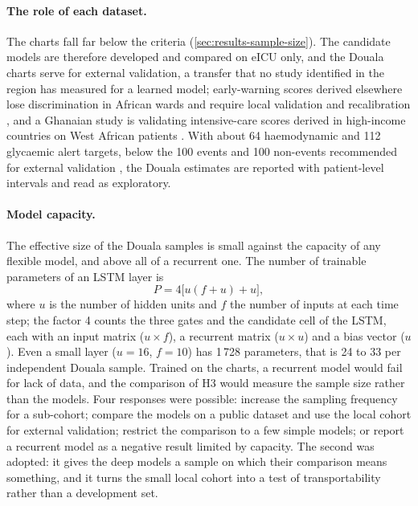 \paragraph{The role of each dataset.} The charts fall far below the criteria (\cref{sec:results-sample-size}). The candidate models are therefore developed and compared on eICU only, and the Douala charts serve for external validation, a transfer that no study identified in the region has measured for a learned model; early-warning scores derived elsewhere lose discrimination in African wards and require local validation and recalibration \parencite{moore2017uva,tomas2026ews}, and a Ghanaian study is validating intensive-care scores derived in high-income countries on West African patients \parencite{hayfronbenjamin2026}. With about 64 haemodynamic and 112 glycaemic alert targets, below the 100 events and 100 non-events recommended for external validation \parencite{collins2016,riley2021external}, the Douala estimates are reported with patient-level intervals and read as exploratory.

\paragraph{Model capacity.} The effective size of the Douala samples is small against the capacity of any flexible model, and above all of a recurrent one. The number of trainable parameters of an LSTM layer is
\begin{equation}
  P = 4\bigl[u(f+u) + u\bigr] ,
\end{equation}
where $u$ is the number of hidden units and $f$ the number of inputs at each time step; the factor 4 counts the three gates and the candidate cell of the LSTM, each with an input matrix ($u \times f$), a recurrent matrix ($u \times u$) and a bias vector ($u$). Even a small layer ($u = 16$, $f = 10$) has 1\,728 parameters, that is 24 to 33 per independent Douala sample. Trained on the charts, a recurrent model would fail for lack of data, and the comparison of H3 would measure the sample size rather than the models. Four responses were possible: increase the sampling frequency for a sub-cohort; compare the models on a public dataset and use the local cohort for external validation; restrict the comparison to a few simple models; or report a recurrent model as a negative result limited by capacity. The second was adopted: it gives the deep models a sample on which their comparison means something, and it turns the small local cohort into a test of transportability rather than a development set.

